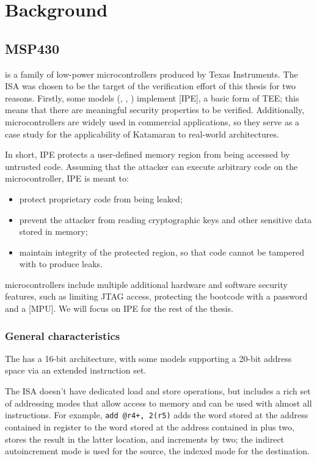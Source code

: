 \chapter{Background}
\label{ch:background}

\section[\texorpdfstring{\msp}{MSP430}]{MSP430}

\msp is a family of low-power microcontrollers produced by Texas Instruments. The \msp ISA was chosen to be the target of the verification effort of this thesis for two reasons. Firstly, some models (\msp[FR58xx], \msp[FR59xx], \msp[FR6xx]) implement [IPE], a basic form of TEE; this means that there are meaningful security properties to be verified. Additionally, \msp microcontrollers are widely used in commercial applications, so they serve as a case study for the applicability of Katamaran to real-world architectures.

In short, IPE protects a user-defined memory region from being accessed by untrusted code. Assuming that the attacker can execute arbitrary code on the microcontroller, IPE is meant to:
\begin{itemize}
\item protect proprietary code from being leaked;
\item prevent the attacker from reading cryptographic keys and other sensitive data stored in memory;
\item maintain integrity of the protected region, so that code cannot be tampered with to produce leaks.
\end{itemize}

\msp microcontrollers include multiple additional hardware and software security features, such as limiting JTAG access, protecting the bootcode with a password \cite{slaa685} and a [MPU]. We will focus on IPE for the rest of the thesis.

\subsection{General characteristics}

The \msp has a 16-bit architecture, with some models supporting a 20-bit address space via an extended instruction set.

The ISA doesn't have dedicated load and store operations, but includes a rich set of addressing modes that allow access to memory and can be used with almost all instructions. For example, \texttt{add @r4+, 2(r5)} adds the word stored at the address contained in register  to the word stored at the address contained in  plus two, stores the result in the latter location, and increments  by two; the indirect autoincrement mode is used for the source, the indexed mode for the destination.

